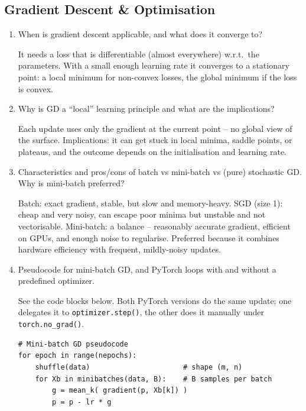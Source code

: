 \documentclass[10pt,a4paper]{article}
\newcommand{\q}[1]{\item #1}
\begin{document}
\subsection{Gradient Descent \& Optimisation}

\begin{enumerate}[leftmargin=*,label=\textbf{Q\arabic*.}]

\q When is gradient descent applicable, and what does it converge to?
\begin{answerbox}
It needs a loss that is differentiable (almost everywhere) w.r.t.\ the parameters. With a small enough learning rate it converges to a stationary point: a local minimum for non-convex losses, the global minimum if the loss is convex.
\end{answerbox}

\q Why is GD a ``local'' learning principle and what are the implications?
\begin{answerbox}
Each update uses only the gradient at the current point -- no global view of the surface. Implications: it can get stuck in local minima, saddle points, or plateaus, and the outcome depends on the initialisation and learning rate.
\end{answerbox}

\q Characteristics and pros/cons of batch vs mini-batch vs (pure) stochastic GD. Why is mini-batch preferred?
\begin{answerbox}
Batch: exact gradient, stable, but slow and memory-heavy. SGD (size 1): cheap and very noisy, can escape poor minima but unstable and not vectorisable. Mini-batch: a balance -- reasonably accurate gradient, efficient on GPUs, and enough noise to regularise. Preferred because it combines hardware efficiency with frequent, mildly-noisy updates.
\end{answerbox}

\q Pseudocode for mini-batch GD, and PyTorch loops with and without a predefined optimizer.
\begin{answerbox}
See the code blocks below. Both PyTorch versions do the same update; one delegates it to \texttt{optimizer.step()}, the other does it manually under \texttt{torch.no\_grad()}.
\end{answerbox}
\begin{verbatim}
# Mini-batch GD pseudocode
for epoch in range(nepochs):
    shuffle(data)                      # shape (m, n)
    for Xb in minibatches(data, B):    # B samples per batch
        g = mean_k( gradient(p, Xb[k]) )
        p = p - lr * g


\end{verbatim}
\end{enumerate}
\end{document}
